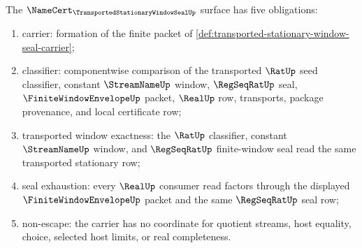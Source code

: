 \begin{theorem}
\label{thm:transported-stationary-window-seal-namecert-obligations}
The $\NameCert_{\TransportedStationaryWindowSealUp}$ surface has five obligations:
\begin{enumerate}
\item carrier: formation of the finite packet of \autoref{def:transported-stationary-window-seal-carrier};
\item classifier: componentwise comparison of the transported $\RatUp$ seed classifier, constant $\StreamNameUp$ window, $\RegSeqRatUp$ seal, $\FiniteWindowEnvelopeUp$ packet, $\RealUp$ row, transports, package provenance, and local certificate row;
\item transported window exactness: the $\RatUp$ classifier, constant $\StreamNameUp$ window, and $\RegSeqRatUp$ finite-window seal read the same transported stationary row;
\item seal exhaustion: every $\RealUp$ consumer read factors through the displayed $\FiniteWindowEnvelopeUp$ packet and the same $\RegSeqRatUp$ seal row;
\item non-escape: the carrier has no coordinate for quotient streams, host equality, choice, selected host limits, or real completeness.
\end{enumerate}
\end{theorem}
